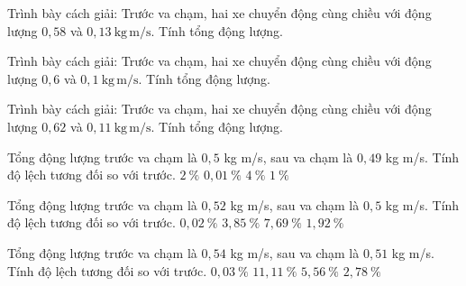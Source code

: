 \begin{bt}
Trình bày cách giải: Trước va chạm, hai xe chuyển động cùng chiều với động lượng $0,58$ và $0,13\ \mathrm{kg\,m/s}$. Tính tổng động lượng.
\end{bt}

\begin{bt}
Trình bày cách giải: Trước va chạm, hai xe chuyển động cùng chiều với động lượng $0,6$ và $0,1\ \mathrm{kg\,m/s}$. Tính tổng động lượng.
\end{bt}

\begin{bt}
Trình bày cách giải: Trước va chạm, hai xe chuyển động cùng chiều với động lượng $0,62$ và $0,11\ \mathrm{kg\,m/s}$. Tính tổng động lượng.
\end{bt}

\begin{ex}
Tổng động lượng trước va chạm là $0,5$ kg m/s, sau va chạm là $0,49$ kg m/s. Tính độ lệch tương đối so với trước.
\choice
{\True $2\ \mathrm{\%}$}
{$0,01\ \mathrm{\%}$}
{$4\ \mathrm{\%}$}
{$1\ \mathrm{\%}$}
\end{ex}

\begin{ex}
Tổng động lượng trước va chạm là $0,52$ kg m/s, sau va chạm là $0,5$ kg m/s. Tính độ lệch tương đối so với trước.
\choice
{$0,02\ \mathrm{\%}$}
{\True $3,85\ \mathrm{\%}$}
{$7,69\ \mathrm{\%}$}
{$1,92\ \mathrm{\%}$}
\end{ex}

\begin{ex}
Tổng động lượng trước va chạm là $0,54$ kg m/s, sau va chạm là $0,51$ kg m/s. Tính độ lệch tương đối so với trước.
\choice
{$0,03\ \mathrm{\%}$}
{$11,11\ \mathrm{\%}$}
{\True $5,56\ \mathrm{\%}$}
{$2,78\ \mathrm{\%}$}
\end{ex}

